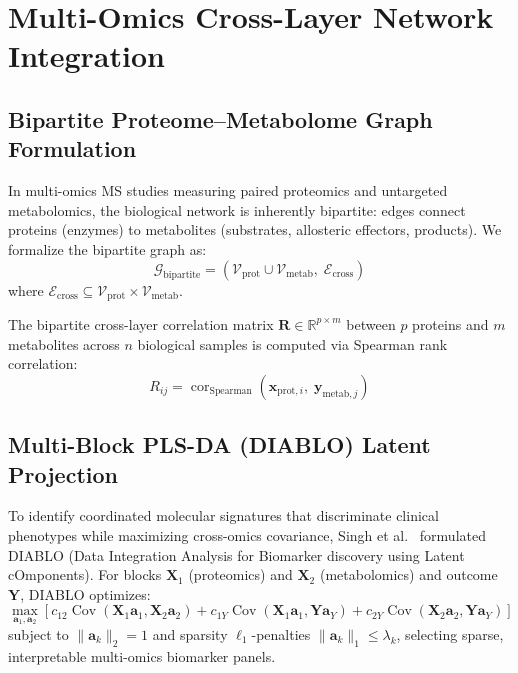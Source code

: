 \documentclass[11pt,twoside,openright]{book}
\begin{document}
\section{Multi-Omics Cross-Layer Network Integration}

\subsection{Bipartite Proteome--Metabolome Graph Formulation}

In multi-omics MS studies measuring paired proteomics and untargeted metabolomics, the biological network is inherently bipartite: edges connect proteins (enzymes) to metabolites (substrates, allosteric effectors, products). We formalize the bipartite graph as:
\begin{equation}
\mathcal{G}_{\text{bipartite}} = (\mathcal{V}_{\text{prot}} \cup \mathcal{V}_{\text{metab}}, \; \mathcal{E}_{\text{cross}})
\end{equation}
where $\mathcal{E}_{\text{cross}} \subseteq \mathcal{V}_{\text{prot}} \times \mathcal{V}_{\text{metab}}$.

The bipartite cross-layer correlation matrix $\mathbf{R} \in \mathbb{R}^{p \times m}$ between $p$ proteins and $m$ metabolites across $n$ biological samples is computed via Spearman rank correlation:
\begin{equation}
R_{ij} = \operatorname{cor}_{\text{Spearman}}(\mathbf{x}_{\text{prot}, i}, \; \mathbf{y}_{\text{metab}, j})
\end{equation}

\subsection{Multi-Block PLS-DA (DIABLO) Latent Projection}

To identify coordinated molecular signatures that discriminate clinical phenotypes while maximizing cross-omics covariance, Singh et al.~\cite{singh2019diablo} formulated DIABLO (Data Integration Analysis for Biomarker discovery using Latent cOmponents). For blocks $\mathbf{X}_1$ (proteomics) and $\mathbf{X}_2$ (metabolomics) and outcome $\mathbf{Y}$, DIABLO optimizes:
\begin{equation}
\label{eq:diablo_objective}
\max_{\mathbf{a}_1, \mathbf{a}_2} \left[ c_{12} \operatorname{Cov}(\mathbf{X}_1 \mathbf{a}_1, \mathbf{X}_2 \mathbf{a}_2) + c_{1Y} \operatorname{Cov}(\mathbf{X}_1 \mathbf{a}_1, \mathbf{Y}\mathbf{a}_Y) + c_{2Y} \operatorname{Cov}(\mathbf{X}_2 \mathbf{a}_2, \mathbf{Y}\mathbf{a}_Y) \right]
\end{equation}
subject to $\|\mathbf{a}_k\|_2 = 1$ and sparsity $\ell_1$-penalties $\|\mathbf{a}_k\|_1 \le \lambda_k$, selecting sparse, interpretable multi-omics biomarker panels.
\end{document}

